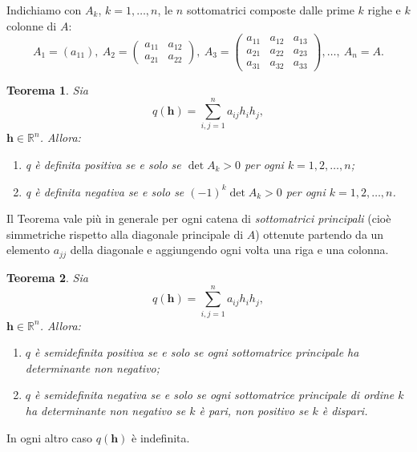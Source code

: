 \documentclass[a4paper]{book}
\numberwithin{equation}{section}
\theoremstyle{plain}
\newtheorem{teor}{Teorema}[section]
\theoremstyle{definition}
\theoremstyle{remark}
\renewcommand{\vec}{\boldsymbol}
\theoremstyle{example}
\begin{document}
Indichiamo con $A_k$, $k = 1, \dots, n$, le $n$ sottomatrici composte dalle prime $k$ righe e $k$ colonne di $A$:
\begin{equation*}
A_1 = (a_{11}), \ A_2 = \begin{pmatrix} a_{11} & a_{12} \\ a_{21} & a_{22} \end{pmatrix}, \ A_3 = \begin{pmatrix} a_{11} & a_{12} & a_{13} \\ a_{21} & a_{22} & a_{23} \\ a_{31} & a_{32} & a_{33} \end{pmatrix}, \dots, \ A_n = A.
\end{equation*}

\begin{teor}
Sia
	\begin{equation*}
	q(\vec{h}) = \sum_{i,j = 1}^n a_{ij}h_ih_j,
	\end{equation*}
$\vec{h} \in \mathbb{R}^n$. Allora:
	\begin{enumerate}
	\item q è definita positiva se e solo se $\det{A_k} > 0$ per ogni $k = 1, 2, \dots, n$;
	\item q è definita negativa se e solo se $(-1)^k\det{A_k} > 0$ per ogni $k = 1, 2, \dots, n$.
	\end{enumerate}
\end{teor}

Il Teorema vale più in generale per ogni catena di \emph{sottomatrici principali} (cioè simmetriche rispetto alla diagonale principale di $A$) ottenute partendo da un elemento $a_{jj}$ della diagonale e aggiungendo ogni volta una riga e una colonna.

\begin{teor}
Sia
	\begin{equation*}
	q(\vec{h}) = \sum_{i,j = 1}^na_{ij}h_ih_j,
	\end{equation*}
$\vec{h} \in \mathbb{R}^n$. Allora:
	\begin{enumerate}
	\item $q$ è semidefinita positiva se e solo se ogni sottomatrice principale ha determinante non negativo;
	\item $q$ è semidefinita negativa se e solo se ogni sottomatrice principale di ordine $k$ ha determinante non negativo se $k$ è pari, non positivo se $k$ è dispari.
	\end{enumerate}
\end{teor}
In ogni altro caso $q(\vec{h})$ è indefinita.
\end{document}
